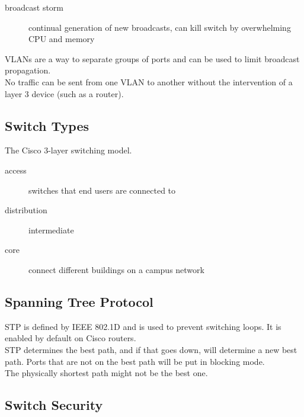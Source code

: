 \begin{description}

\item[broadcast storm]
continual generation of new broadcasts, can kill switch by overwhelming
CPU and memory

\end{description}

VLANs are a way to separate groups of ports and can be used to limit broadcast
propagation.\\

No traffic can be sent from one VLAN to another without the intervention of
a layer 3 device (such as a router).

\subsection{Switch Types}

The Cisco 3-layer switching model.

\begin{description}

\item[access]
switches that end users are connected to

\item[distribution]
intermediate

\item[core]
connect different buildings on a campus network

\end{description}

\subsection{Spanning Tree Protocol}

STP is defined by IEEE 802.1D and is used to prevent switching loops. It is
enabled by default on Cisco routers.\\

STP determines the best path, and if that goes down, will determine a new best
path. Ports that are not on the best path will be put in blocking mode.\\

The physically shortest path might not be the best one.

\subsection{Switch Security}

